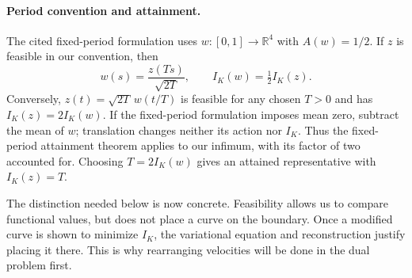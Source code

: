 \paragraph{Period convention and attainment.}
The cited fixed-period formulation uses $w:[0,1]\to\mathbb R^4$ with
$A(w)=1/2$. If $z$ is feasible in our convention, then
\[
 w(s)=\frac{z(Ts)}{\sqrt{2T}},\qquad I_K(w)=\tfrac12 I_K(z).
\]
Conversely, $z(t)=\sqrt{2T}\,w(t/T)$ is feasible for any chosen $T>0$
and has $I_K(z)=2I_K(w)$. If the fixed-period formulation imposes mean zero,
subtract the mean of $w$; translation changes neither its action nor $I_K$.
Thus the fixed-period attainment theorem applies
to our infimum, with its factor of two accounted for. Choosing
$T=2I_K(w)$ gives an attained representative with $I_K(z)=T$.

The distinction needed below is now concrete. Feasibility allows us to
compare functional values, but does not place a curve on the boundary.
Once a modified curve is shown to minimize $I_K$, the variational equation
and reconstruction justify placing it there. This is why rearranging
velocities will be done in the dual problem first.
